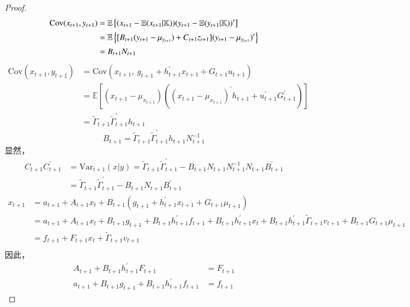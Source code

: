  \begin{proof}
     \begin{align*}
        \mathrm{Cov}(x_{t+1},y_{t+1})&=\mathbb{E}\left[(x_{t+1}-\mathbb{E}(x_{t+1}\vert \mathbb{K}))(y_{t+1}-\mathbb{E}(y_{t+1}\vert \mathbb{K}))^\prime\right] \\
        &=\mathbb{E}\left\{[B_{t+1}(y_{t+1}-\mu_{y_{t+1}})+C_{t+1}z_{t+1}](y_{t+1}-\mu_{y_{t+1}})^\prime\right\} \\
        &=B_{t+1}N_{t+1}
     \end{align*}
     \begin{align*}
        \mathrm{Cov}(x_{t+1},y_{t+1})&=\mathrm{Cov}(x_{t+1},\ g_{t+1}+h_{t+1}^\prime x_{t+1}+G_{t+1}u_{t+1}) \\
         &= \mathbb{E}\left[(x_{t+1}-\mu_{x_{t+1}})((x_{t+1}-\mu_{x_{t+1}})^\prime h_{t+1}+u_{t+1}^\prime G_{t+1}^\prime)\right] \\
         &= \tilde{\Gamma}_{t+1}\tilde{\Gamma}_{t+1}^\prime h_{t+1}
     \end{align*}
     \begin{equation}
         B_{t+1}=\tilde{\Gamma}_{t+1}\tilde{\Gamma}_{t+1}^\prime h_{t+1} N_{t+1}^{-1}
     \end{equation} 
     显然，
     \begin{equation}
        \begin{split}
            C_{t+1}C_{t+1}^\prime &= \mathrm{Var}_{t+1}(x\vert y)=\tilde{\Gamma}_{t+1}\tilde{\Gamma}_{t+1}^\prime
                    -B_{t+1}N_{t+1}N_{t+1}^{-1}N_{t+1}B_{t+1}^\prime \\
                &= \tilde{\Gamma}_{t+1}\tilde{\Gamma}_{t+1}^\prime -B_{t+1}N_{t+1}B_{t+1}^\prime
        \end{split}
     \end{equation}
     \begin{equation*}
         \begin{split}
             x_{t+1} &= a_{t+1}+A_{t+1}x_t+B_{t+1}(g_{t+1}+h_{t+1}^\prime x_{t+1}+G_{t+1}\mu_{t+1}) \\
             &= a_{t+1}+A_{t+1}x_t+B_{t+1}g_{t+1}+B_{t+1}h_{t+1}^\prime f_{t+1}+B_{t+1}h_{t+1}^\prime x_t+
                B_{t+1}h_{t+1}^\prime \tilde{\Gamma}_{t+1}v_{t+1}+B_{t+1}G_{t+1}\mu_{t+1} \\
             &=f_{t+1}+F_{t+1}x_t+\tilde{\Gamma}_{t+1}v_{t+1} \\
         \end{split}
     \end{equation*}
     因此，
     \begin{equation*}
         \begin{split}
             A_{t+1}+B_{t+1}h_{t+1}^\prime F_{t+1} &= F_{t+1} \\
             a_{t+1} + B_{t+1}g_{t+1}+B_{t+1}h_{t+1}^\prime f_{t+1} &= f_{t+1}
         \end{split}
     \end{equation*}
\end{proof}


